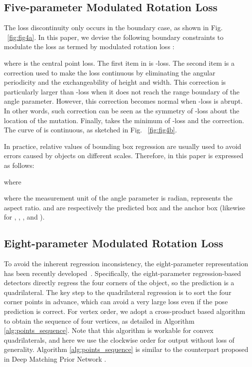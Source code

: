 \documentclass[10pt,twocolumn,letterpaper]{article}
\begin{document}
\subsection{Five-parameter Modulated Rotation Loss}
 The loss discontinuity only occurs in the boundary case, as shown in Fig. ~\ref{fig:fig4a}. In this paper, we devise the following boundary constraints to modulate the loss as termed by modulated rotation loss :


where  is the central point loss. The first item in  is -loss. The second item is a correction used to make the loss continuous by eliminating the angular periodicity and the exchangeability of height and width. This correction is particularly larger than -loss when it does not reach the range boundary of the angle parameter. However, this correction becomes normal when -loss is abrupt. In other words, such correction can be seen as the symmetry of -loss about the location of the mutation. Finally,  takes the minimum of -loss and the correction. The curve of  is continuous, as sketched in Fig. ~\ref{fig:fig4b}.

In practice, relative values of bounding box regression are usually used to avoid errors caused by objects on different scales. Therefore,  in this paper is expressed as follows:


    
    where

where the measurement unit of the angle parameter is radian,  represents the aspect ratio.  and  are respectively the predicted box and the anchor box (likewise for , , , and ).

\subsection{Eight-parameter Modulated Rotation Loss}
To avoid the inherent regression inconsistency, the eight-parameter representation has been recently developed~\cite{R31_liao2018textboxes++,liu2017deep,liu2019omnidirectional}. Specifically, the eight-parameter regression-based detectors directly regress the four corners of the object, so the prediction is a quadrilateral. The key step to the quadrilateral regression is to sort the four corner points in advance, which can avoid a very large loss even if the pose prediction is correct. For vertex order, we adopt a cross-product based algorithm to obtain the sequence of four vertices, as detailed in Algorithm \ref{alg:points_sequence}. Note that this algorithm is workable for convex quadrilaterals, and here we use the clockwise order for output without loss of generality. Algorithm \ref{alg:points_sequence} is similar to the counterpart proposed in Deep Matching Prior Network \cite{liu2017deep}.
\end{document}

